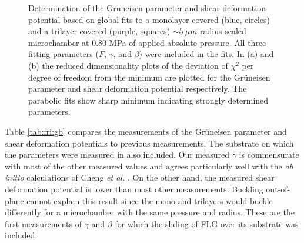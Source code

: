 \begin{figure}
	\begin{center}
	
	\end{center}
	\caption[Determination of the Gr\"{u}neisen parameter and shear deformation potential]{\label{fig:fri:gammabeta}Determination of the Gr\"{u}neisen parameter and shear deformation potential based on global fits to a monolayer covered (blue, circles) and a trilayer covered (purple, squares) $\sim 5 \ \mu m$ radius sealed microchamber at 0.80 MPa of applied absolute pressure.
	All three fitting parameters ($F$, $\gamma$, and $\beta$) were included in the fits.
	In (a) and (b) the reduced dimensionality plots of the deviation of $\chi^2$ per degree of freedom from the minimum are plotted for the Gr\"{u}neisen parameter and shear deformation potential respectively.
	The parabolic fits show sharp minimum indicating strongly determined parameters.
	}
\end{figure}

Table \ref{tab:fri:gb} compares the measurements of the Gr\"{u}neisen parameter and shear deformation potentials to previous measurements.
The substrate on which the parameters were measured in also included.
Our measured $\gamma$ is commensurate with most of the other measured values and agrees particularly well with the \textit{ab initio} calculations of Cheng \textit{et al.} \cite{Cheng2011}.
On the other hand, the measured shear deformation potential is lower than most other measurements.
Buckling out-of-plane cannot explain this result since the mono and trilayers would buckle differently for a microchamber with the same pressure and radius.
These are the first measurements of $\gamma$ and $\beta$ for which the sliding of FLG over its substrate was included.

